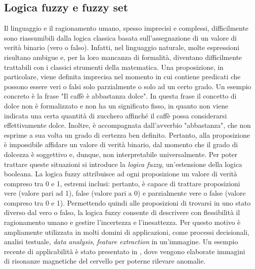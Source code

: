 \documentclass[11pt]{article}
\begin{document}
	\subsection{Logica fuzzy e fuzzy set}
Il linguaggio e il ragionamento umano, spesso imprecisi e complessi, difficilmente sono riassumibili dalla logica classica basata sull'assegnazione di un valore di verità binario (vero o falso). Infatti, nel linguaggio naturale, molte espressioni risultano ambigue e, per la loro mancanza di formalità, diventano difficilmente trattabili con i classici strumenti della matematica. Una proposizione, in particolare, viene definita imprecisa nel momento in cui contiene predicati che possono essere veri o falsi solo parzialmente o solo ad un certo grado. Un esempio concreto è la frase "Il caffè è abbastanza dolce". In questa frase il concetto di dolce non è formalizzato e non ha un significato fisso, in quanto non viene indicata una certa quantità di zucchero affinché il caffè possa considerarsi effettivamente dolce. Inoltre, è accompagnata dall'avverbio "abbastanza", che non esprime a sua volta un grado di certezza ben definito. Pertanto, alla proposizione è impossibile affidare un valore di verità binario, dal momento che il grado di dolcezza è soggettivo e, dunque, non interpretabile universalmente. Per poter trattare queste situazioni si introduce la \textit{logica fuzzy}\cite{fuzzylogicintro}, un'estensione della logica booleana. La logica fuzzy attribuisce ad ogni proposizione un valore di verità compreso tra 0 e 1, estremi inclusi: pertanto, è capace di trattare proposizioni vere (valore pari ad 1), false (valore pari a 0) e parzialmente vere o false (valore compreso tra 0 e 1). Permettendo quindi alle proposizioni di trovarsi in uno stato diverso dal vero o falso, la logica fuzzy consente di descrivere con flessibilità il ragionamento umano e gestire l'incertezza e l'inesattezza. Per questo motivo è ampliamente utilizzata in molti domini di applicazioni, come processi decisionali, analisi testuale, \textit{data analysis}, \textit{feature extraction} in un'immagine. Un esempio recente di applicabilità è stato presentato in \cite{fuzzybraintumor}, dove vengono elaborate immagini di risonanze magnetiche del cervello per poterne rilevare anomalie. 
\end{document}
